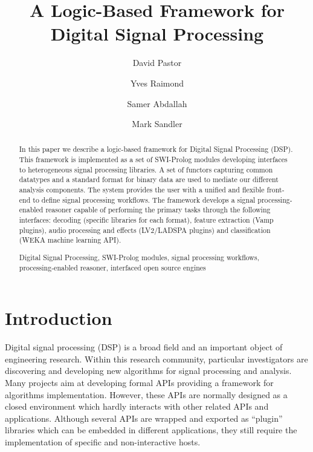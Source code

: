 \documentclass[runningheads]{llncs}
\newcommand{\keywords}[1]{\par\addvspace\baselineskip
\noindent\keywordname\enspace\ignorespaces#1}
\begin{document}
\mainmatter

\title{A Logic-Based Framework for Digital Signal Processing}


\author{David Pastor\and Yves Raimond\and Samer Abdallah\and Mark Sandler}


\maketitle


\begin{abstract}
In this paper we describe a logic-based framework for Digital Signal Processing (DSP). This framework is implemented as a set of SWI-Prolog modules developing interfaces to heterogeneous signal processing libraries. A set of functors capturing common datatypes and a standard format for binary data are used to mediate our different analysis components. The system provides the user with a unified and flexible front-end to define signal processing workflows. The framework develops a signal processing-enabled reasoner capable of performing the primary tasks through the following interfaces: decoding (specific libraries for each format), feature extraction (Vamp plugins), audio processing and effects (LV2/LADSPA plugins) and classification (WEKA machine learning API).

\keywords{Digital Signal Processing, SWI-Prolog modules, signal processing workflows, processing-enabled reasoner, interfaced open source engines}
\end{abstract}

\section{Introduction}\label{sec:intro}
Digital signal processing (DSP) is a broad field and an important object of engineering research. Within this research community, particular investigators are discovering and developing new algorithms for signal processing and analysis. Many projects aim at developing formal APIs providing a framework for algorithms implementation. However, these APIs are normally designed as a closed environment which hardly interacts with other related APIs and applications. Although several APIs are wrapped and exported as ``plugin'' libraries which can be embedded in different applications, they still require the implementation of specific and non-interactive hosts.
\end{document}
